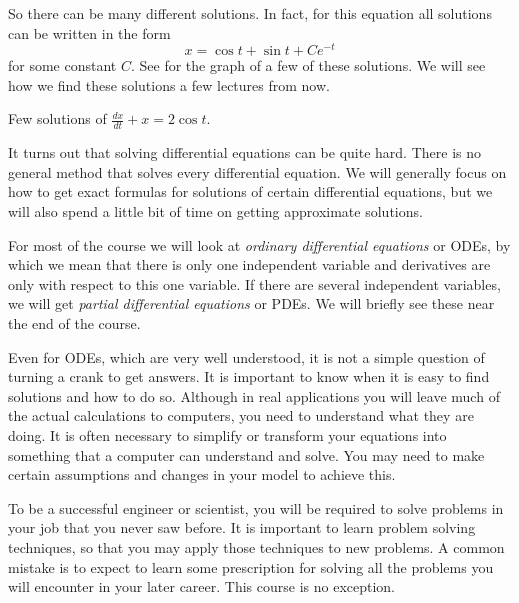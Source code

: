 So there can be many different solutions.  In fact, for this equation all
solutions can be written in the form
\begin{equation*}
x = \cos t + \sin t + C e^{-t}
\end{equation*}
for some constant $C$.  See  for the graph of a
few of these solutions. 
We will see how we find these solutions
a few lectures from now.

\begin{mywrapfig}{3.25in}
\capstart
{}
\caption{Few solutions of $\frac{dx}{dt} + x = 2 \cos t$.\label{intro:plotsfig}}
\end{mywrapfig}%

\medskip

It turns out that solving differential equations can be quite hard.  
There is no general method that solves every differential equation.  We will
generally focus on how to get exact formulas for solutions of certain
differential
equations, but we will also spend a little bit of time
on getting approximate solutions.

For most of the course we will look at
\emph{ordinary differential equations} or ODEs, by which we mean that there
is only one independent variable and derivatives are only with respect to
this one variable.
If there are several independent variables, we will get
\emph{partial differential equations}
or PDEs.
We will briefly see these near the
end of the course.

Even for ODEs, which are very well understood, it is not a simple question
of turning a crank to get answers.  
It is important to
know when it is easy to find solutions and how to do so.
Although in real applications you will
leave much of the actual calculations to computers, you
need to understand what they are doing.  It is often necessary
to simplify or transform your equations into something that a computer can
understand and solve.
You may need to make certain assumptions and changes in your
model to achieve this.

To be a successful engineer or scientist, you will be required to solve
problems in your job that you never saw before.  It is important to
learn problem solving techniques, so that you may apply those techniques to
new problems.  A common mistake is to expect to learn some prescription for
solving all the problems you will encounter in your later career.  This
course is no exception.


